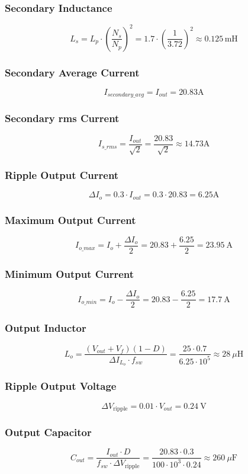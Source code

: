 \subsubsection*{Secondary Inductance}
\[
L_s = L_p \cdot \left( \frac{N_s}{N_p} \right)^2 
= 1.7 \cdot \left( \frac{1}{3.72} \right)^2 \approx \boxed{0.125\,\text{mH}}
\]
\subsubsection*{Secondary Average Current}
\[
I_{secondary\_avg} = I_{out} = 20.83\text{A}
\]
\subsubsection*{Secondary rms Current}
\[
I_{s\_rms} = \frac{I_{out}}{\sqrt{2}} = \frac{20.83}{\sqrt{2}} \approx 14.73 \text{A}
\]
\subsubsection*{Ripple Output Current}
\[
\Delta I_o = 0.3 \cdot I_{out} = 0.3 \cdot 20.83 = 6.25 \text{A}
\]
\subsubsection*{Maximum Output Current}
\[
I_{o\_max} =  I_o + \frac{\Delta I_o}{2} = 20.83 + \frac{6.25}{2} = 23.95\ \text{A}
\]
\subsubsection*{Minimum Output Current}
\[
I_{o\_min} = I_o - \frac{\Delta I_o}{2} = 20.83 - \frac{6.25}{2} = 17.7\ \text{A}
\]
\subsubsection*{Output Inductor}
\[
L_o = \frac{(V_{out} + V_f)(1 - D)}{\Delta I_{L_o} \cdot f_{sw}} = \frac{25 \cdot 0.7}{6.25 \cdot 10^5} \approx 28\ \mu\text{H}
\]
\subsubsection*{Ripple Output Voltage}
\[
\Delta V_{\text{ripple}} = 0.01 \cdot V_{out} = 0.24\ \text{V}
\]
\subsubsection*{Output Capacitor}
\[
C_{out} = \frac{I_{out} \cdot D}{f_{sw} \cdot \Delta V_{\text{ripple}}} = \frac{20.83 \cdot 0.3}{100 \cdot 10^3 \cdot 0.24}\approx 260\ \mu\text{F}
\]
